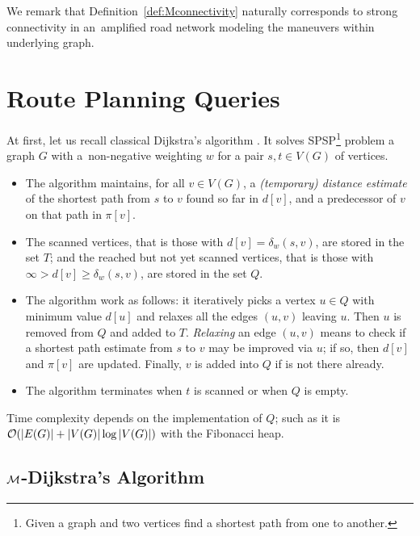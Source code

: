 \documentclass[envcountsect,envcountsame]{llncs}
\begin{document}
We remark that Definition~\ref{def:Mconnectivity} naturally corresponds to 
strong connectivity in an~amplified road network modeling the maneuvers 
within underlying graph.

\section{Route Planning Queries}
\label{sec:query}

At first, let us recall classical Dijkstra's algorithm \cite{Dijkstra1959}.
It solves SPSP\footnote{Given a graph and two vertices find a shortest path 
from one to another.} problem a graph $G$ with a~non-negative weighting $w$ 
for a pair $s,t\in V(G)$ of vertices.

\begin{itemize}
\parskip 3pt
\item The algorithm maintains, for all $v \in V(G)$, a 
  {\em (temporary) distance estimate} of the shortest path from $s$ to $v$ 
  found so far in $d[v]$, and a predecessor of $v$ on that path in $\pi[v]$. 

\item The scanned vertices, that is those with $d[v] = \delta_w(s,v)$, 
  are stored in the set $T$; and the reached but not yet scanned vertices, 
  that is those with $\infty >d[v] \geq \delta_w(s,v)$, are stored in the set $Q$. 

\item The algorithm work as follows: it iteratively picks a vertex $u \in Q$ 
  with minimum value $d[u]$ and relaxes all the edges $(u,v)$ leaving $u$.
  Then $u$ is removed from $Q$ and added to $T$. {\em Relaxing} an edge $(u,v)$
  means to check if a shortest path estimate from $s$ to $v$ may be improved 
  via $u$; if so, then $d[v]$ and $\pi[v]$ are updated. Finally, $v$ is added 
  into $Q$ if is not there already. 

\item The algorithm terminates when $t$ is scanned or when $Q$ is empty.
\end{itemize}

Time complexity depends on the implementation of $Q$; such as it is 
${\cal{O}}(|E(G)| + |V(G)|\log|V(G)|)$ with the Fibonacci heap.

\subsection{$\cal{M}$-Dijkstra's Algorithm}
\label{sec:Mdijkstra}
\end{document}
